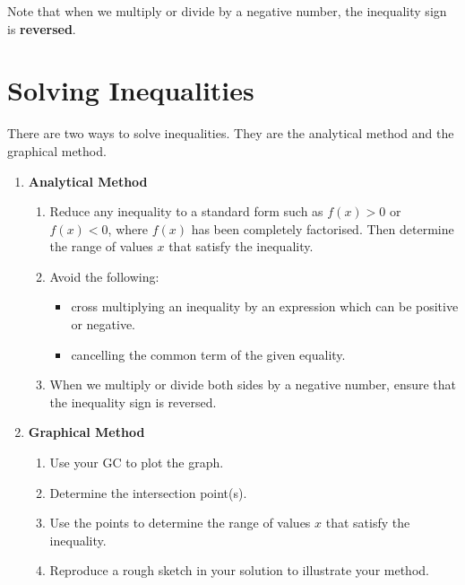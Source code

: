 \documentclass[11pt,a4paper]{book}
\begin{document}
Note that when we multiply or divide by a negative number, the inequality sign is \textbf{reversed}.

\newpage

\section{Solving Inequalities}

There are two ways to solve inequalities. They are the analytical
method and the graphical method.

\begin{tcolorbox}[colback=blue!5, colframe=black,boxrule=.4pt, sharpish corners]

\begin{enumerate}[label=\textbf{(\alph*)}]

\item \textbf{Analytical Method}

\begin{enumerate}[label=(\roman*)]

\item Reduce any inequality to a standard form such as $f\left(x\right)>0$
or $f\left(x\right)<0$, where $f\left(x\right)$ has been completely
factorised. Then determine the range of values $x$ that satisfy the
inequality.

\item Avoid the following:
\begin{itemize}
\item cross multiplying an inequality by an expression which can be positive
or negative.
\item cancelling the common term of the given equality.
\end{itemize}
\item When we multiply or divide both sides by a negative number,
ensure that the inequality sign is reversed.

\end{enumerate}

\item \textbf{Graphical Method}

\begin{enumerate}[label=(\roman*)]

\item Use your GC to plot the graph.

\item Determine the intersection point(s).

\item Use the points to determine the range of values $x$ that satisfy
the inequality.

\item Reproduce a rough sketch in your solution to illustrate your
method.

\end{enumerate}

\end{enumerate}
\end{tcolorbox}
\end{document}
